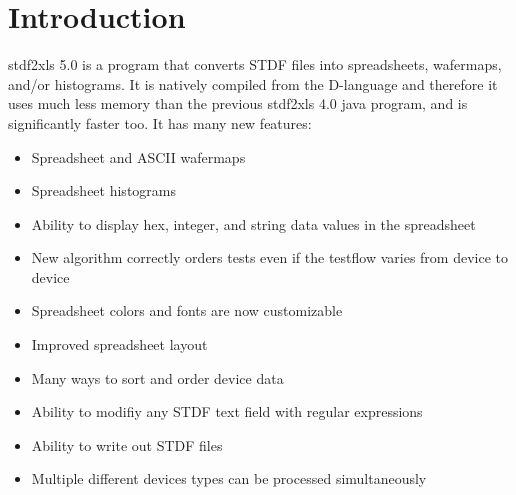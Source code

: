 \documentclass[letterpaper]{article}
\begin{document}
\selectfont
\newcommand{\tfont}{\usefont{T1}{ua1}{m}{n}\selectfont\footnotesize}
\newcommand{\bfont}{\usefont{T1}{ua1}{b}{n}\selectfont\tiny}
\newcommand{\xfont}{\usefont{T1}{ua1}{m}{n}\selectfont\scriptsize}
\newcommand{\lfont}{\usefont{T1}{ua1}{m}{n}\selectfont\large}
\renewcommand{\captionfont}{\it }
\renewcommand{\date}{February 26, 2020}
\newcommand{\ver}{V1.0}
\newcommand{\tablecap}{\hline\end{tabular}\end{table}\end{center}}
\renewcommand{\versionhistory}{
\vspace*{1in}
\begin{center}
\begin{table}[H]\caption*{Revision History}
\centering
\xfont\begin{tabular}[H]{|c|c|c|c|}
\hline
{\bf Version} & {\bf Author} & {\bf Date} & {\bf Changes}\\
\hline
\hline
1.0 & Eric West & 2/26/20 & Initial Release \\
\hline
\end{tabular}
\end{table}
\end{center}
}
\maketitle
\setcounter{tocdepth}{2}
\tableofcontents
\clearpage
\makebg

\section{Introduction}
stdf2xls 5.0 is a program that converts STDF files into spreadsheets, wafermaps, and/or histograms.
It is natively compiled from the D-language and therefore it uses much less memory than the previous
stdf2xls 4.0 java program, and is significantly faster too.  It has many new features:
\begin{itemize}
\item Spreadsheet and ASCII wafermaps
\item Spreadsheet histograms
\item Ability to display hex, integer, and string data values in the spreadsheet
\item New algorithm correctly orders tests even if the testflow varies from device to device
\item Spreadsheet colors and fonts are now customizable
\item Improved spreadsheet layout
\item Many ways to sort and order device data
\item Ability to modifiy any STDF text field with regular expressions
\item Ability to write out STDF files
\item Multiple different devices types can be processed simultaneously
\end{itemize}
\end{document}
